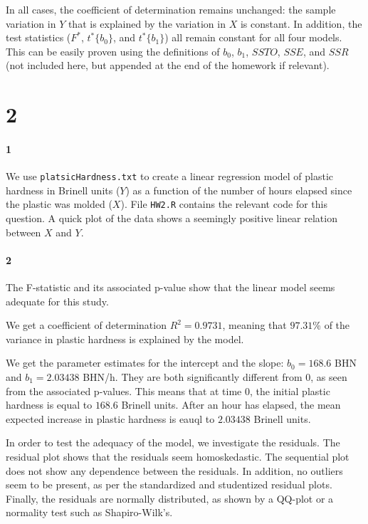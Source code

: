 \documentclass[]{article}
\let\oldparagraph\paragraph
\renewcommand{\paragraph}[1]{\oldparagraph{#1}\mbox{}}
\begin{document}
In all cases, the coefficient of determination remains unchanged: the sample variation in $Y$ that is explained by the variation in $X$ is constant. In addition, the test statistics ($F^*$, $t^*\{b_0\}$, and $t^*\{b_1\}$) all remain constant for all four models. This can be easily proven using the definitions of $b_0$, $b_1$, $SSTO$, $SSE$, and $SSR$ (not included here, but appended at the end of the homework if relevant).

\section*{2}
\paragraph{1}
We use \texttt{platsicHardness.txt} to create a linear regression model of plastic hardness in Brinell units ($Y$) as a function of the number of hours elapsed since the plastic was molded ($X$). File \texttt{HW2.R} contains the relevant code for this question. A quick plot of the data shows a seemingly positive linear relation between $X$ and $Y$.

\paragraph{2}
The F-statistic and its associated p-value show that the linear model seems adequate for this study.

We get a coefficient of determination $R^2 = 0.9731$, meaning that $97.31$\% of the variance in plastic hardness is explained by the model. 

We get the parameter estimates for the intercept and the slope: $b_0 = 168.6$ BHN and $b_1 = 2.03438$ BHN/h. They are both significantly different from $0$, as seen from the associated p-values. This means that at time 0, the initial plastic hardness is equal to $168.6$ Brinell units. After an hour has elapsed, the mean expected increase in plastic hardness is eauql to $2.03438$ Brinell units.

In order to test the adequacy of the model, we investigate the residuals. The residual plot shows that the residuals seem homoskedastic. The sequential plot does not show any dependence between the residuals. In addition, no outliers seem to be present, as per the standardized and studentized residual plots. Finally, the residuals are normally distributed, as shown by a QQ-plot or a normality test such as Shapiro-Wilk's.
\end{document}
